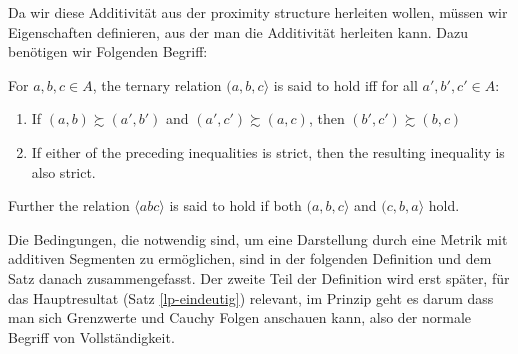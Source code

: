 
Da wir diese Additivität aus der proximity structure herleiten wollen, müssen wir Eigenschaften definieren, aus der man die Additivität herleiten kann. Dazu benötigen wir Folgenden Begriff:

\begin{defi}
For $a, b, c \in  A$, the ternary relation $(a, b, c \rangle$ is said to hold iff for all $a', b', c' \in A$:
\begin{enumerate}
  \item If $(a ,b) \succsim (a', b')$ and  $(a', c') \succsim (a, c)$, then  $(b', c') \succsim (b, c)$
  \item If either of the preceding inequalities is strict, then the resulting inequality is also strict.
\end{enumerate}
Further the relation $\langle abc \rangle$ is said to hold if both $(a, b, c \rangle$ and $(c, b, a\rangle$ hold.
\end{defi}


Die Bedingungen, die notwendig sind, um eine Darstellung durch eine Metrik mit additiven Segmenten zu ermöglichen, sind in der folgenden Definition und dem Satz danach zusammengefasst. Der zweite Teil der Definition wird erst später, für das Hauptresultat (Satz \ref{lp-eindeutig}) relevant, im Prinzip geht es darum dass man sich Grenzwerte und Cauchy Folgen anschauen kann, also der normale Begriff von Vollständigkeit.

